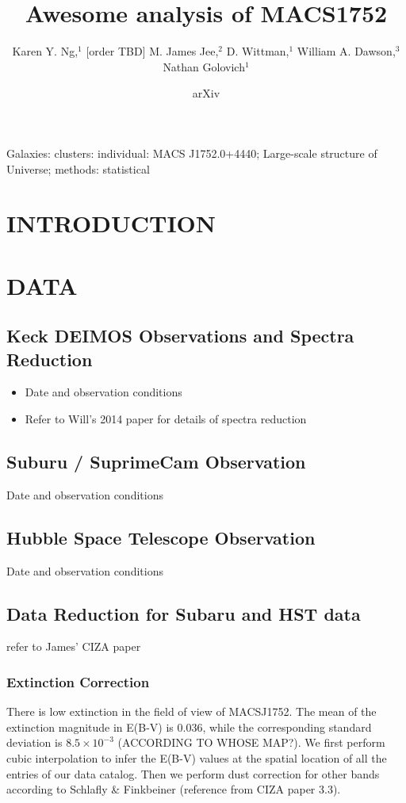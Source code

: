 \documentclass[letterpaper,useAMS,usenatbib]{mn2e}
\title[
	Awesome analysis of MACS1752 
]
{Awesome analysis of MACS1752}
\author[Karen Y. Ng et al.]{Karen Y. Ng,$^{1}$
	[order TBD]
	M. James Jee,$^{2}$
	D. Wittman,$^{1}$
	William A. Dawson,$^{3}$ 
	\newauthor Nathan Golovich$^{1}$
}
\begin{document}
\date{arXiv} \pagerange{\pageref{firstpage}--\pageref{lastpage}}
 \maketitle\label{firstpage}
\begin{abstract} 
	
\end{abstract}
\begin{keywords}
Galaxies: clusters: individual: MACS J1752.0+4440; Large-scale structure of
Universe; methods: statistical 
\end{keywords}
\section{INTRODUCTION} 
\section{DATA}
\subsection{Keck DEIMOS Observations and Spectra Reduction}
\begin{itemize}
	\item Date and observation conditions
	\item Refer to Will's 2014 paper for details of spectra reduction 
\end{itemize}

\subsection{Suburu / SuprimeCam Observation}
Date and observation conditions

\subsection{Hubble Space Telescope Observation} 
Date and observation conditions

\subsection{Data Reduction for Subaru and HST data}
refer to James' CIZA paper

\subsubsection{Extinction Correction}
There is low extinction in the field of view of MACSJ1752. The mean of the extinction
magnitude in E(B-V) is 0.036, while the corresponding standard deviation 
is $8.5 \times 10^{-3}$ (ACCORDING TO WHOSE MAP?).
We first perform cubic interpolation to infer the E(B-V) values at the spatial
location of all the entries of our data catalog. Then we perform dust
correction for other bands according to Schlafly \& Finkbeiner (reference from CIZA paper 3.3).
\end{document}
